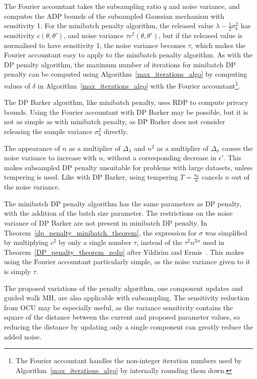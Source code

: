 \documentclass[english,twoside,openright]{HYgraduMLDS}
\begin{document}
The Fourier accountant takes the subsampling ratio \(q\) and noise variance,
and computes the ADP bounds of the subsampled Gaussian mechanism with sensitivity
1. For the minibatch penalty algorithm, the released value
\(\lambda - \frac{1}{2}\sigma_{b}^{2}\) has sensitivity \(c(\theta, \theta')\),
and noise variance \(\tau c^{2}(\theta, \theta')\), but if the released value is
normalised to have sensitivity 1, the noise variance becomes \(\tau\), which makes
the Fourier accountant easy to apply to the minibatch penalty algorithm.
As with the DP penalty algorithm, the maximum number of iterations
for minibatch DP penalty can be computed using Algorithm~\ref{max_iterations_algo}
by computing values of \(\delta\) in Algorithm~\ref{max_iterations_algo}
with the Fourier accountant\footnote{
  The Fourier accountant handles the non-integer iteration numbers used
  by Algorithm~\ref{max_iterations_algo} by internally
  rounding them down.
}.

The DP Barker algorithm, like minibatch penalty, uses RDP to compute privacy
bounds. Using the Fourier accountant with DP Barker may be possible, but it is
not as simple as with minibatch penalty, as DP Barker does not consider
releasing the sample variance \(\sigma_{b}^{2}\) directly.

The appearance of \(n\) as a multiplier of \(\Delta_\lambda\) and 
\(n^2\) as a multiplier of \(\Delta_\sigma\) causes the noise variance to increase 
with \(n\), without a corresponding decrease in \(\epsilon'\). This makes subsampled 
DP penalty unsuitable for problems with large datasets, unless tempering is 
used. Like with DP Barker, using tempering \(T = \frac{n_0}{n}\) cancels \(n\)
out of the noise variance.

The minibatch DP penalty algorithm has the same parameters as DP penalty, with
the addition of the batch size parameter. The restrictions on the noise variance
of DP Barker are not present in minibatch DP penalty. In
Theorem~\ref{dp_penalty_minibatch_theorem}, the expression for \(\sigma\) was
simplified by multiplying \(c^{2}\) by only a single number \(\tau\), instead
of the \(\tau^{2}n^{2\alpha}\) used in Theorem~\ref{DP_penalty_theorem_zcdp}
after Yildirim and Ermis~\cite{YildirimE19}. This makes using the Fourier
accountant particularly simple, as the noise variance given to it is simply
\(\tau\).

The proposed variations of the penalty algorithm, one component updates and guided
walk MH, are also applicable with subsampling. The sensitivity reduction from
OCU may be especially useful, as the variance sensitivity contains the square of
the distance between the current and proposed parameter values, so reducing the
distance by updating only a single component can greatly reduce the added noise.
\end{document}
